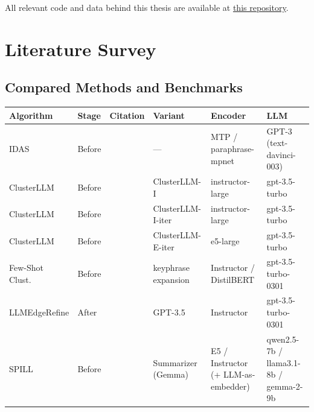 \documentclass[11pt,a4paper,oneside]{report}
\begin{document}
All relevant code and data behind this thesis are available at \href{https://github.com/louisarts/LLM_clustering}{this repository}.


\clearpage



\clearpage
\appendix

\chapter{Literature Survey}\label{app:litstat}

\section{Compared Methods and Benchmarks}\label{app:roster}

\begin{table}[!htbp]
\centering
\footnotesize
\setlength{\tabcolsep}{4pt}
\renewcommand{\arraystretch}{1.15}
\begin{tabularx}{\textwidth}{@{}l l >{\raggedright\arraybackslash}p{2.7cm} >{\raggedright\arraybackslash}p{2.4cm} >{\raggedright\arraybackslash}X >{\raggedright\arraybackslash}X@{}}
\toprule
\textbf{Algorithm} & \textbf{Stage} & \textbf{Citation} & \textbf{Variant} & \textbf{Encoder} & \textbf{LLM} \\
\midrule
IDAS                & Before     & \citet{deraedt2023idas}            & ---                      & MTP / paraphrase-mpnet                  & GPT-3 (text-davinci-003) \\
ClusterLLM          & Before     & \citet{zhang2023clusterllm}        & ClusterLLM-I             & instructor-large                   & gpt-3.5-turbo \\
ClusterLLM          & Before     & \citet{zhang2023clusterllm}        & ClusterLLM-I-iter        & instructor-large                   & gpt-3.5-turbo \\
ClusterLLM          & Before     & \citet{zhang2023clusterllm}        & ClusterLLM-E-iter        & e5-large                           & gpt-3.5-turbo \\
Few-Shot Clust.\    & Before     & \citet{viswanathan2024fewshot}     & keyphrase expansion      & Instructor / DistilBERT            & gpt-3.5-turbo-0301 \\
LLMEdgeRefine       & After      & \citet{feng2024llmedgerefine}      & GPT-3.5                  & Instructor                         & gpt-3.5-turbo-0301 \\
SPILL               & Before     & \citet{lin2025spill}               & Summarizer (Gemma)       & E5 / Instructor (+ LLM-as-embedder) & qwen2.5-7b / llama3.1-8b / gemma-2-9b \\

\end{tabularx}
\end{table}
\end{document}
